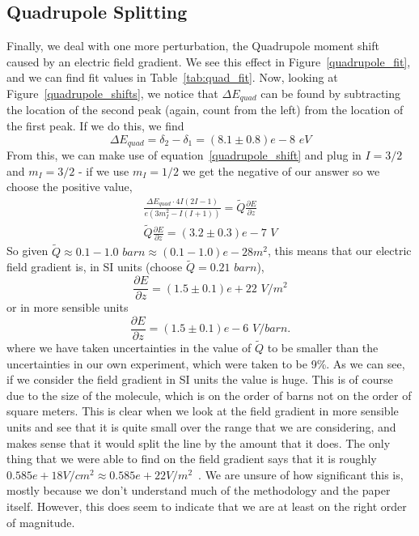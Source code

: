 \documentclass[reprint, nobibnotes, amssymb, amsmath, amsfonts, mathtools, mathrsfs, floatfix]{revtex4-1}
\begin{document}
    \subsection{Quadrupole Splitting}
      Finally, we deal with one more perturbation, the Quadrupole moment shift caused by an electric field gradient.  We see this effect in Figure~\ref{quadrupole_fit}, and we can find fit values in Table~\ref{tab:quad_fit}.  Now, looking at Figure~\ref{quadrupole_shifts}, we notice that $\Delta E_{quad}$ can be found by subtracting the location of the second peak (again, count from the left) from the location of the first peak.  If we do this, we find
      \begin{equation}
        \Delta E_{quad} = \delta_2 - \delta_1 = (8.1 \pm 0.8)e-8 \,\, eV
      \end{equation}
      From this, we can make use of equation~\ref{quadrupole_shift} and plug in $I = 3/2$ and $m_I = 3/2$ - if we use $m_I = 1/2$ we get the negative of our answer so we choose the positive value,
      \begin{gather}
        \frac{\Delta E_{quad} \cdot 4I(2I-1)}{e\left(3 m_I^2 - I(I+1)\right)} = \tilde{Q}\frac{\partial E}{\partial z} \\
        \tilde{Q}\frac{\partial E}{\partial z} = (3.2\pm0.3)e-7 \,\, V
      \end{gather}
      So given $\tilde{Q} \approx 0.1-1.0 \,\, barn \approx (0.1-1.0)e-28 m^{2}$, this means that our electric field gradient is, in SI units (choose $\tilde{Q} = 0.21\,\, barn$\cite{field_gradient}),
      \begin{equation}
        \frac{\partial E}{\partial z} = (1.5\pm0.1)e+22 \,\, V/m^2
      \end{equation}
      or in more sensible units
      \begin{equation}
        \frac{\partial E}{\partial z} = (1.5\pm0.1)e-6\,\, V/barn.
      \end{equation}
      where we have taken uncertainties in the value of $\tilde{Q}$ to be smaller than the uncertainties in our own experiment, which were taken to be 9\%.  As we can see, if we consider the field gradient in SI units the value is huge.  This is of course due to the size of the molecule, which is on the order of barns not on the order of square meters.  This is clear when we look at the field gradient in more sensible units and see that it is quite small over the range that we are considering, and makes sense that it would split the line by the amount that it does.  The only thing that we were able to find on the field gradient says that it is roughly $0.585e+18 V/cm^2 \approx 0.585e+22 V/m^2$~\cite{na_nitroprusside}.  We are unsure of how significant this is, mostly because we don't understand much of the methodology and the paper itself.  However, this does seem to indicate that we are at least on the right order of magnitude.
\end{document}
